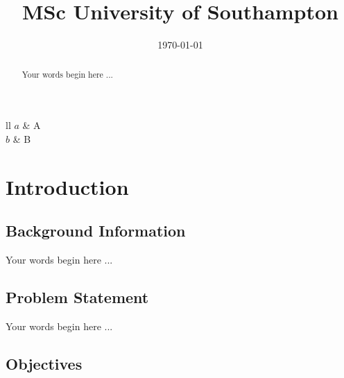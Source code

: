 \documentclass{ecsthesis}       %
\title{MSc University of Southampton} %
\date{\today}
\begin{document}
\maketitle
\begin{abstract}

Your words begin here ...

\end{abstract}



\tableofcontents                           %

\listoffigures                             %

\listoftables                              %


\listofsymbols                             %
{ll}{
	$a$ & A	\\
	$b$ & B	
}

\mainmatter

\chapter{Introduction} \label{Chapter:introduction}

\section{Background Information}\label{background-information}

Your words begin here ...

\section{Problem Statement}\label{problem-statement}

Your words begin here ...

\section{Objectives}\label{objectives}
\end{document}
